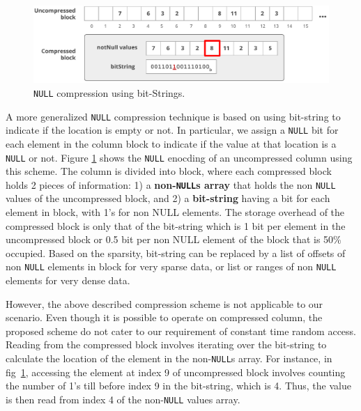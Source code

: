\begin{figure}
	\vspace{-20pt}
	\hfill\includegraphics[scale=0.70]{img/null1}\hspace*{\fill}
	\captionsetup{justification=centering}
	\caption{\texttt{NULL} compression using bit-Strings.}
	\label{fig:null1}
	\vspace{-5pt}
\end{figure}

A more generalized \texttt{NULL} compression technique is based on using bit-string to indicate if the location is empty or not. In particular, we assign a \texttt{NULL} bit for each element in the column block to indicate if the value at that location is a \texttt{NULL} or not. Figure \ref{fig:null1} shows the \texttt{NULL} enocding of an uncompressed column using this scheme. The column is divided into block, where each compressed block holds 2 pieces of information: 1) a \textbf{non-\texttt{NULL}s array} that holds the non \texttt{NULL} values of the uncompressed block, and 2) a \textbf{bit-string} having a bit for each element in block, with 1's for non NULL elements. The storage overhead of the compressed block is only that of the bit-string which is 1 bit per element in the uncompressed block or 0.5 bit per non NULL element of the block that is 50\% occupied. Based on the sparsity, bit-string can be replaced by a list of offsets of non \texttt{NULL} elements in block for very sparse data, or list or ranges of non \texttt{NULL} elements for very dense data.

However, the above described compression scheme is not applicable to our scenario. Even though it is possible to operate on compressed column, the proposed scheme do not cater to our requirement of constant time random access. Reading from the compressed block involves iterating over the bit-string to calculate the location of the element in the non-\texttt{NULL}s array. For instance, in fig~\ref{fig:null1}, accessing the element at index 9 of uncompressed block involves counting the number of 1's till before index 9 in the bit-string, which is 4. Thus, the value is then read from index 4 of the non-\texttt{NULL} values array.

